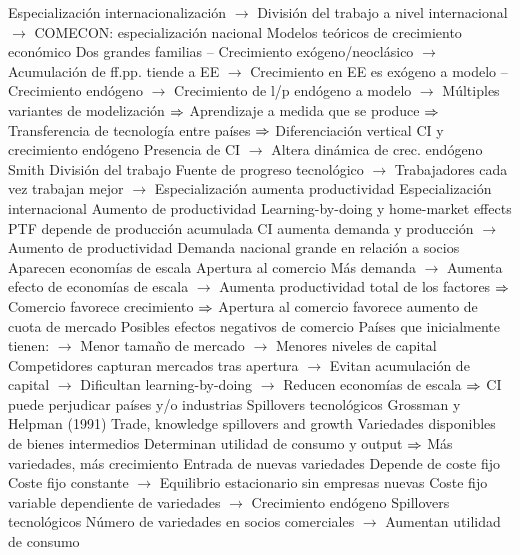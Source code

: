 \documentclass{nuevotema}
\begin{document}
\begin{esquemal}
				\4[] Especialización internacionalización
				\4[] $\to$ División del trabajo a nivel internacional
				\4[] $\to$ COMECON: especialización nacional
				\4 Modelos teóricos de crecimiento económico
				\4[] Dos grandes familias
				\4[] -- Crecimiento exógeno/neoclásico
				\4[] $\to$ Acumulación de ff.pp. tiende a EE
				\4[] $\to$ Crecimiento en EE es exógeno a modelo
				\4[] -- Crecimiento endógeno
				\4[] $\to$ Crecimiento de l/p endógeno a modelo
				\4[] $\to$ Múltiples variantes de modelización
				\4[] $\Rightarrow$ Aprendizaje a medida que se produce
				\4[] $\Rightarrow$ Transferencia de tecnología entre países
				\4[] $\Rightarrow$ Diferenciación vertical
				\4 CI y crecimiento endógeno
				\4[] Presencia de CI
				\4[] $\to$ Altera dinámica de crec. endógeno
			\3 Smith
				\4 División del trabajo
				\4[] Fuente de progreso tecnológico
				\4[] $\to$ Trabajadores cada vez trabajan mejor
				\4[] $\to$ Especialización aumenta productividad
				\4 Especialización internacional
				\4[] Aumento de productividad
			\3 Learning-by-doing y home-market effects
				\4 PTF depende de producción acumulada
				\4[] CI aumenta demanda y producción
				\4[] $\to$ Aumento de productividad
				\4 Demanda nacional grande en relación a socios
				\4[] Aparecen economías de escala
				\4 Apertura al comercio
				\4[] Más demanda
				\4[] $\to$ Aumenta efecto de economías de escala
				\4[] $\to$ Aumenta productividad total de los factores
				\4[] $\Rightarrow$ Comercio favorece crecimiento
				\4[] $\Rightarrow$ Apertura al comercio favorece aumento de cuota de mercado
				\4 Posibles efectos negativos de comercio
				\4[] Países que inicialmente tienen:
				\4[] $\to$ Menor tamaño de mercado
				\4[] $\to$ Menores niveles de capital
				\4[] Competidores capturan mercados tras apertura
				\4[] $\to$ Evitan acumulación de capital
				\4[] $\to$ Dificultan learning-by-doing
				\4[] $\to$ Reducen economías de escala
				\4[] $\Rightarrow$ CI puede perjudicar países y/o industrias
			\3 Spillovers tecnológicos
				\4 Grossman y Helpman (1991)
				\4[] Trade, knowledge spillovers and growth
				\4 Variedades disponibles de bienes intermedios
				\4[] Determinan utilidad de consumo y output
				\4[] $\Rightarrow$ Más variedades, más crecimiento
				\4 Entrada de nuevas variedades
				\4[] Depende de coste fijo
				\4[] Coste fijo constante
				\4[] $\to$ Equilibrio estacionario sin empresas nuevas
				\4[] Coste fijo variable dependiente de variedades
				\4[] $\to$ Crecimiento endógeno
				\4 Spillovers tecnológicos
				\4[] Número de variedades en socios comerciales
				\4[] $\to$ Aumentan utilidad de consumo

\end{esquemal}
\end{document}
